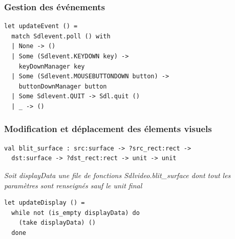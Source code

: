 \begin{frame}[fragile]
	\frametitle{Gestion des événements}
	\begin{lstlisting}
let updateEvent () = 
  match Sdlevent.poll () with
  | None -> ()
  | Some (Sdlevent.KEYDOWN key) -> 
    keyDownManager key
  | Some (Sdlevent.MOUSEBUTTONDOWN button) -> 
    buttonDownManager button
  | Some Sdlevent.QUIT -> Sdl.quit ()
  | _ -> ()
	\end{lstlisting}
\end{frame}

\begin{frame}[fragile]
	\frametitle{Modification et déplacement des élements visuels}
	\lstset{basicstyle=\scriptsize}
	\begin{lstlisting}
val blit_surface : src:surface -> ?src_rect:rect -> 
  dst:surface -> ?dst_rect:rect -> unit -> unit
	\end{lstlisting}
	\textit{Soit displayData une file de fonctions Sdlvideo.blit\_surface dont tout les paramètres sont renseignés sauf le unit final}
	\lstset{basicstyle=\normalsize}
	\begin{lstlisting}
let updateDisplay () = 
  while not (is_empty displayData) do
    (take displayData) ()
  done
	\end{lstlisting}
\end{frame}

